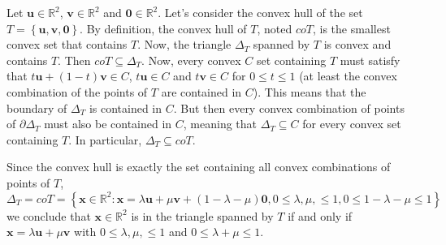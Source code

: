 \documentclass[12pt]{article}
\begin{document}
Let $\mathbf{u}\in\mathbb{R}^{2}$, $\mathbf{v}\in\mathbb{R}^{2}$
and $\mathbf{0}\in\mathbb{R}^{2}$. Let's consider the convex hull
of the set $T=\left\{ \mathbf{u},\mathbf{v},\mathbf{0}\right\} $.
By definition, the convex hull of $T$, noted $coT$, is the smallest
convex set that contains $T$. Now, the triangle $\Delta_{T}$ spanned
by $T$ is convex and contains $T$. Then $coT\subseteq\Delta_{T}$.
Now, every convex $C$ set containing $T$ must satisfy that $t\mathbf{u}+\left(1-t\right)\mathbf{v}\in C$,
$t\mathbf{u}\in C$ and $t\mathbf{v}\in C$ for $0\leq t\leq1$ (at
least the convex combination of the points of $T$ are contained in
$C$). This means that the boundary of $\Delta_{T}$ is contained
in $C$. But then every convex combination of points of $\partial\Delta_{T}$
must also be contained in $C$, meaning that $\Delta_{T}\subseteq C$
for every convex set containing $T$. In particular, $\Delta_{T}\subseteq coT$.

Since the convex hull is exactly the set containing all convex combinations
of points of $T$,\[
\Delta_{T}=coT=\left\{ \mathbf{x}\in\mathbb{R}^{2}:\mathbf{x}=\lambda\mathbf{u}+\mu\mathbf{v}+\left(1-\lambda-\mu\right)\mathbf{0},0\leq\lambda,\mu,\leq1,0\leq1-\lambda-\mu\leq1\right\} \]
we conclude that $\mathbf{x}\in\mathbb{R}^{2}$ is in the triangle
spanned by $T$ if and only if $\mathbf{x}=\lambda\mathbf{u}+\mu\mathbf{v}$
with $0\leq\lambda,\mu,\leq1$ and $0\leq\lambda+\mu\leq1$.
\end{document}
